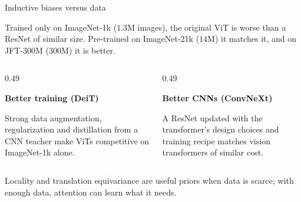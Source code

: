 \begin{frame}{Inductive biases versus data}
    \setlength{\parskip}{6pt}

    Trained only on ImageNet-1k ($1.3$M images), the original ViT is worse than
    a ResNet of similar size. Pre-trained on ImageNet-21k ($14$M) it matches
    it, and on JFT-300M ($300$M) it is better.

    \begin{columns}[T,onlytextwidth]
        \begin{column}{0.49\textwidth}
            \begin{tcolorbox}[nndsblue,courseheight={tf-bias}{0.3\textheight}]
                \textbf{\color{darkcerulean}Better training (DeiT)}

                Strong data augmentation, regularization and distillation from
                a CNN teacher make ViTs competitive on ImageNet-1k alone.
            \end{tcolorbox}
        \end{column}
        \begin{column}{0.49\textwidth}
            \begin{tcolorbox}[nndsgreen,courseheight={tf-bias}{0.3\textheight}]
                \textbf{\color{darkgreen}Better CNNs (ConvNeXt)}

                A ResNet updated with the transformer's design choices and
                training recipe matches vision transformers of similar cost.
            \end{tcolorbox}
        \end{column}
    \end{columns}

    \medskip
    Locality and translation equivariance are useful priors when data is
    scarce; with enough data, attention can learn what it needs.


\end{frame}

